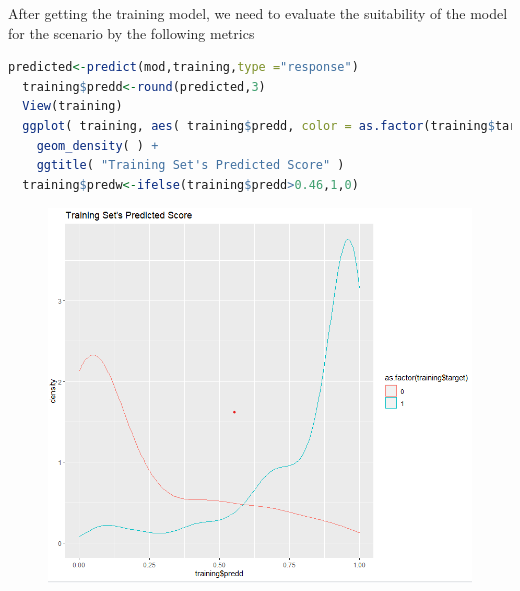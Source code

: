 \documentclass{article}
\begin{document}
After getting the training model, we need to evaluate the suitability of the model for the scenario by the following metrics
\begin{lstlisting}[language=R]
  predicted<-predict(mod,training,type ="response")
  training$predd<-round(predicted,3)
  View(training)
  ggplot( training, aes( training$predd, color = as.factor(training$target) ) ) + 
    geom_density( ) +
    ggtitle( "Training Set's Predicted Score" )
  training$predw<-ifelse(training$predd>0.46,1,0)
\end{lstlisting}
\begin{figure}[H]
  \centering
  \includegraphics[width=1\textwidth]{task1_1_preScore.png}
\end{figure}
\end{document}
